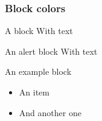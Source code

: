 \documentclass[aspectratio=169]{beamer}
\begin{document}
\begin{frame}
	\frametitle{Block colors}
	\begin{block}{A block}
		With text
	\end{block}
	\begin{alertblock}{An alert block}
		With text
	\end{alertblock}
	\begin{exampleblock}{An example block}
		\begin{itemize}
			\item An item
			\item And another one
		\end{itemize}
	\end{exampleblock}
\end{frame}
\end{document}
